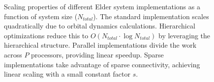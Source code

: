 \begin{figure}[h]
\caption{Scaling properties of different Elder system implementations as a function of system size ($N_{total}$). The standard implementation scales quadratically due to orbital dynamics calculations. Hierarchical optimizations reduce this to $O(N_{total} \cdot \log N_{total})$ by leveraging the hierarchical structure. Parallel implementations divide the work across $P$ processors, providing linear speedup. Sparse implementations take advantage of sparse connectivity, achieving linear scaling with a small constant factor $s$.}
\label{fig:scaling_properties}
\end{figure}
